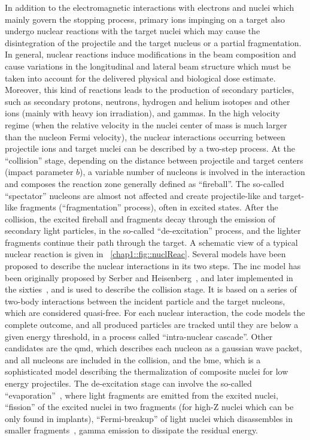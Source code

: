 In addition to the electromagnetic interactions with electrons and nuclei   which mainly govern the stopping process, primary ions impinging on a target also undergo nuclear reactions with the target nuclei which may cause the disintegration of the projectile and the target nucleus or a partial fragmentation. In general, nuclear reactions induce modifications in the beam composition and cause variations in the longitudinal and lateral beam structure which must be taken into account for the delivered physical and biological dose estimate. Moreover, this kind of reactions leads to the production of secondary particles, such as secondary protons, neutrons, hydrogen and helium isotopes and other ions (mainly with heavy ion irradiation), and gammas.
In the high velocity regime (when the relative velocity in the nuclei center of mass is much larger than the nucleon Fermi velocity), the nuclear interactions occurring between projectile ions and target nuclei can be described by a two-step process. At the \enquote{collision} stage, depending on the distance between projectile and target centers (impact parameter $b$), a variable number of nucleons is involved in the interaction and composes the reaction zone generally defined as \enquote{fireball}. The so-called \enquote{spectator} nucleons are almost not affected and create projectile-like and target-like fragments (\enquote{fragmentation} process), often in excited states. After the collision, the excited fireball and fragments decay through the emission of secondary light particles, in the so-called \enquote{de-excitation} process, and the lighter fragments continue their path through the target. A schematic view of a typical nuclear reaction is given in \figurename~\ref{chap1::fig::nuclReac}. 
Several models have been proposed to describe the nuclear interactions in its two steps. The \gls{inc} model has been originally proposed by Serber and Heisenberg~\parencite{Serber1947}, and later implemented in the sixties~\parencite{Bertini1974}, and is used to describe the collision stage. It is based on a series of two-body interactions between the incident particle and the target nucleons, which are considered quasi-free. For each nuclear interaction, the code models the complete outcome, and all produced particles are tracked until they are below a given energy threshold, in a process called \enquote{intra-nuclear cascade}. Other candidates are the \gls{qmd}, which describes each nucleon as a gaussian wave packet, and all nucleons are included in the collision, and the \gls{bme}, which is a sophisticated model describing the thermalization of composite nuclei for low energy projectiles. The de-excitation stage can involve the so-called \enquote{evaporation}~\parencite{Weisskopf1937}, where light fragments are emitted from the excited nuclei, \enquote{fission} of the excited nuclei in two fragments (for high-Z nuclei which can be only found in implants), \enquote{Fermi-breakup} of light nuclei which disassembles in smaller fragments~\parencite{Fermi1950}, gamma emission to dissipate the residual energy. 
